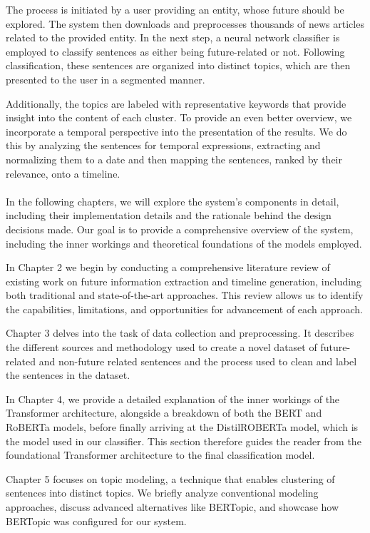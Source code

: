 \documentclass[a4paper,10pt]{report} %
\begin{document}
The process is initiated by a user providing an entity, whose future should be explored. The system then downloads and preprocesses thousands of news articles related to the provided entity. In the next step, a neural network classifier is employed to classify sentences as either being future-related or not. Following classification, these sentences are organized into distinct topics, which are then presented to the user in a segmented manner. 

Additionally, the topics are labeled with representative keywords that provide insight into the content of each cluster. To provide an even better overview, we incorporate a temporal perspective into the presentation of the results. We do this by analyzing the sentences for temporal expressions, extracting and normalizing them to a date and then mapping the sentences, ranked by their relevance, onto a timeline. 
\\\\
In the following chapters, we will explore the system's components in detail, including their implementation details and the rationale behind the design decisions made. Our goal is to provide a comprehensive overview of the system, including the inner workings and theoretical foundations of the models employed.

In Chapter 2 we begin by conducting a comprehensive literature review of existing work on future information extraction and timeline generation, including both traditional and state-of-the-art approaches. This review allows us to identify the capabilities, limitations, and opportunities for advancement of each approach.

Chapter 3 delves into the task of data collection and preprocessing. It describes the different sources and methodology used to create a novel dataset of future-related and non-future related sentences and the process used to clean and label the sentences in the dataset.

In Chapter 4, we provide a detailed explanation of the inner workings of the Transformer architecture, alongside a breakdown of both the BERT and RoBERTa models, before finally arriving at the DistilROBERTa model, which is the model used in our classifier. This section therefore guides the reader from the foundational Transformer architecture to the final classification model.

Chapter 5 focuses on topic modeling, a technique that enables clustering of sentences into distinct topics. We briefly analyze conventional modeling approaches, discuss advanced alternatives like BERTopic, and showcase how BERTopic was configured for our system.
\end{document}
